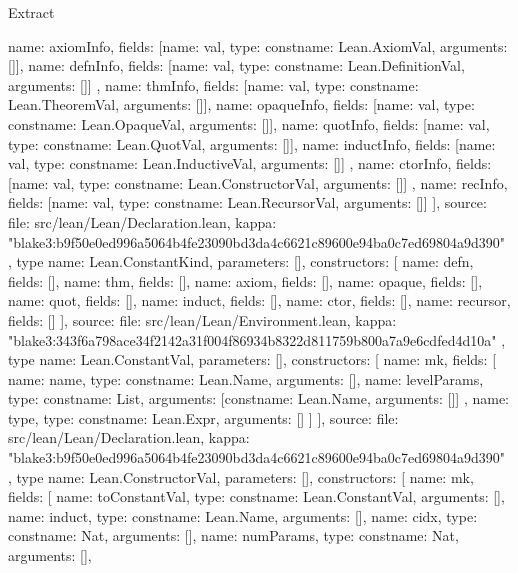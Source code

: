 \begin{lexlean}{Extract}
\begin{toolingmodule}
{{        {name: axiomInfo, fields: [{name: val, type: const{name: Lean.AxiomVal, arguments: []}}]},
        {
          name: defnInfo,
          fields: [{name: val, type: const{name: Lean.DefinitionVal, arguments: []}}]
        },
        {name: thmInfo, fields: [{name: val, type: const{name: Lean.TheoremVal, arguments: []}}]},
        {name: opaqueInfo, fields: [{name: val, type: const{name: Lean.OpaqueVal, arguments: []}}]},
        {name: quotInfo, fields: [{name: val, type: const{name: Lean.QuotVal, arguments: []}}]},
        {
          name: inductInfo,
          fields: [{name: val, type: const{name: Lean.InductiveVal, arguments: []}}]
        },
        {
          name: ctorInfo,
          fields: [{name: val, type: const{name: Lean.ConstructorVal, arguments: []}}]
        },
        {name: recInfo, fields: [{name: val, type: const{name: Lean.RecursorVal, arguments: []}}]}
      ],
      source: {
        file: src/lean/Lean/Declaration.lean,
        kappa: "blake3:b9f50e0ed996a5064b4fe23090bd3da4c6621c89600e94ba0c7ed69804a9d390"
      }
    },
    type{
      name: Lean.ConstantKind,
      parameters: [],
      constructors: [
        {name: defn, fields: []},
        {name: thm, fields: []},
        {name: axiom, fields: []},
        {name: opaque, fields: []},
        {name: quot, fields: []},
        {name: induct, fields: []},
        {name: ctor, fields: []},
        {name: recursor, fields: []}
      ],
      source: {
        file: src/lean/Lean/Environment.lean,
        kappa: "blake3:343f6a798ace34f2142a31f004f86934b8322d811759b800a7a9e6cdfed4d10a"
      }
    },
    type{
      name: Lean.ConstantVal,
      parameters: [],
      constructors: [
        {
          name: mk,
          fields: [
            {name: name, type: const{name: Lean.Name, arguments: []}},
            {
              name: levelParams,
              type: const{name: List, arguments: [const{name: Lean.Name, arguments: []}]}
            },
            {name: type, type: const{name: Lean.Expr, arguments: []}}
          ]
        }
      ],
      source: {
        file: src/lean/Lean/Declaration.lean,
        kappa: "blake3:b9f50e0ed996a5064b4fe23090bd3da4c6621c89600e94ba0c7ed69804a9d390"
      }
    },
    type{
      name: Lean.ConstructorVal,
      parameters: [],
      constructors: [
        {
          name: mk,
          fields: [
            {name: toConstantVal, type: const{name: Lean.ConstantVal, arguments: []}},
            {name: induct, type: const{name: Lean.Name, arguments: []}},
            {name: cidx, type: const{name: Nat, arguments: []}},
            {name: numParams, type: const{name: Nat, arguments: []}},
}}}
\end{toolingmodule}
\end{lexlean}
